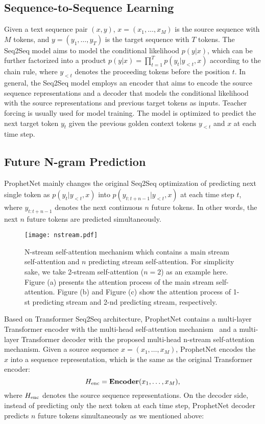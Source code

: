 \documentclass[11pt,a4paper]{article}
\begin{document}
\subsection{Sequence-to-Sequence Learning}
Given a text sequence pair $(x, y)$, $x = (x_1, \dots, x_M)$ is the source sequence with $M$ tokens, and $y = (y_1, \dots, y_T)$ is the target sequence with $T$ tokens.
The Seq2Seq model aims to model the conditional likelihood $p(y | x)$, which can be further factorized into a product $p(y | x) = \prod^{T}_{t=1} p(y_t | y_{<t},
x)$ according to the chain rule, where $y_{<t}$ denotes the proceeding tokens before the position $t$.
In general, the Seq2Seq model employs an encoder that aims to encode the source sequence representations and a decoder that models the conditional likelihood with the source representations and previous target tokens as inputs.
Teacher forcing is usually used for model training. The model is optimized to predict the next target token $y_t$ given the previous golden context tokens $y_{<t}$ and $x$ at each time step.

\subsection{Future N-gram Prediction} \label{sec:m1}
ProphetNet mainly changes the original Seq2Seq optimization of predicting next single token as $p(y_{t}|y_{<t}, x)$ into $p(y_{t:t+n-1}|y_{<t}, x)$ at each time step $t$, where $y_{t:t+n-1}$ denotes the next continuous $n$ future tokens.
In other words, the next $n$ future tokens are predicted simultaneously. 


\begin{figure*}[h]
    \centering
	\texttt{[image: nstream.pdf]}
	\caption{N-stream self-attention mechanism which contains a main stream self-attention and $n$ predicting stream self-attention. For simplicity sake, we take 2-stream self-attention ($n=2$) as an example here. Figure (a) presents the attention process of the main stream self-attention. Figure (b) and Figure (c) show the attention process of 1-st predicting stream and 2-nd predicting stream, respectively. }\label {fig:nstream}
\end{figure*}

Based on Transformer Seq2Seq architecture, ProphetNet contains a multi-layer Transformer encoder with the multi-head self-attention mechanism~\cite{vaswani2017attention} and a multi-layer Transformer decoder with the proposed multi-head n-stream self-attention mechanism.
Given a source sequence $x = (x_1, \dots, x_M)$, ProphetNet encodes the $x$ into a sequence representation, which is the same as the original Transformer encoder:
\begin{equation}
H_{\rm{enc}} = \textbf{Encoder}(x_1, \dots, x_M), 
\label{eq:encoder} 
\end{equation}
where $H_{\rm{enc}}$ denotes the source sequence representations.
On the decoder side, instead of predicting only the next token at each time step, ProphetNet decoder predicts $n$ future tokens simultaneously as we mentioned above:
\end{document}
